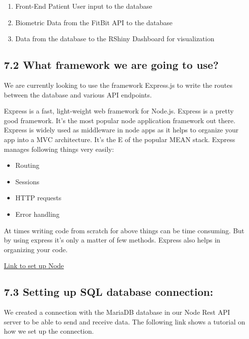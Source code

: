 \documentclass[]{book}
\providecommand{\tightlist}{%
  \setlength{\itemsep}{0pt}\setlength{\parskip}{0pt}}
\begin{document}
\begin{enumerate}
\def\labelenumi{\arabic{enumi}.}
\tightlist
\item
  Front-End Patient User input to the database
\item
  Biometric Data from the FitBit API to the database
\item
  Data from the database to the RShiny Dashboard for visualization
\end{enumerate}

\subsection{7.2 What framework we are going to
use?}\label{what-framework-we-are-going-to-use-1}

We are currently looking to use the framework Express.js to write the
routes between the database and various API endpoints.

Express is a fast, light-weight web framework for Node.js. Express is a
pretty good framework. It's the most popular node application framework
out there. Express is widely used as middleware in node apps as it helps
to organize your app into a MVC architecture. It's the E of the popular
MEAN stack. Express manages following things very easily:

\begin{itemize}
\tightlist
\item
  Routing
\item
  Sessions
\item
  HTTP requests
\item
  Error handling
\end{itemize}

At times writing code from scratch for above things can be time
consuming. But by using express it's only a matter of few methods.
Express also helps in organizing your code.

\href{https://medium.com/@onejohi/building-a-simple-rest-api-with-nodejs-and-express-da6273ed7ca9}{Link
to set up Node}

\subsection{7.3 Setting up SQL database
connection:}\label{setting-up-sql-database-connection-1}

We created a connection with the MariaDB database in our Node Rest API
server to be able to send and receive data. The following link shows a
tutorial on how we set up the connection.
\end{document}
